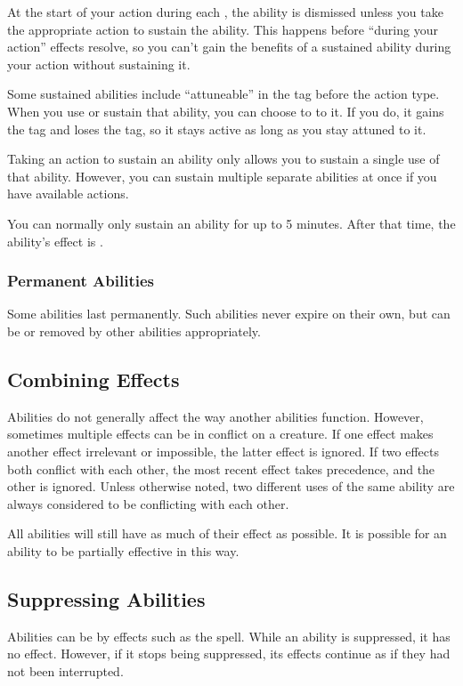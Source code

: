             At the start of your action during each , the ability is dismissed unless you take the appropriate action to sustain the ability.
            This happens before ``during your action'' effects resolve, so you can't gain the benefits of a sustained ability during your action without sustaining it.

            Some sustained abilities include ``attuneable'' in the tag before the action type.
            When you use or sustain that ability, you can choose to  to it.
            If you do, it gains the  tag and loses the  tag, so it stays active as long as you stay attuned to it.

            Taking an action to sustain an ability only allows you to sustain a single use of that ability.
            However, you can sustain multiple separate abilities at once if you have available actions.

            You can normally only sustain an ability for up to 5 minutes.
            After that time, the ability's effect is .

        \subsubsection{Permanent Abilities}
            Some abilities last permanently.
            Such abilities never expire on their own, but can be  or removed by other abilities appropriately.

    \subsection{Combining Effects}
        Abilities do not generally affect the way another abilities function.
        However, sometimes multiple effects can be in conflict on a creature.
        If one effect makes another effect irrelevant or impossible, the latter effect is ignored.
        If two effects both conflict with each other, the most recent effect takes precedence, and the other is ignored.
        Unless otherwise noted, two different uses of the same ability are always considered to be conflicting with each other.

        All abilities will still have as much of their effect as possible.
        It is possible for an ability to be partially effective in this way.

    \subsection{Suppressing Abilities}\label{Suppressing Abilities}
        Abilities can be  by effects such as the  spell.
        While an ability is suppressed, it has no effect.
        However, if it stops being suppressed, its effects continue as if they had not been interrupted.

